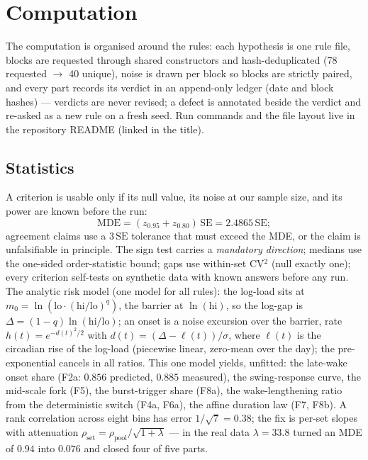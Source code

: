\documentclass[11pt,a4paper]{article}
\theoremstyle{remark}
\begin{document}
\section{Computation}\label{sec:code}
The computation is organised around the rules: each hypothesis is one rule file, blocks
are requested through shared constructors and hash-deduplicated (78 requested $\to$ 40
unique), noise is drawn per block so blocks are strictly paired, and every part records
its verdict in an append-only ledger (date and block hashes) --- verdicts are never
revised; a defect is annotated beside the verdict and re-asked as a new rule on a fresh
seed. Run commands and the file layout live in the repository README (linked in the
title).

\subsection{Statistics}\label{sec:stats}
A criterion is usable only if its null value, its noise at our sample size, and its
power are known before the run:
\begin{equation}\label{eq:mde}
\mathrm{MDE}=(z_{0.95}+z_{0.80})\,\mathrm{SE}=2.4865\,\mathrm{SE};
\end{equation}
agreement claims use a $3\,\mathrm{SE}$ tolerance that must exceed the MDE, or the
claim is unfalsifiable in principle. The sign test carries a \emph{mandatory direction};
medians use the one-sided
order-statistic bound; gaps use within-set CV$^2$ (null exactly one); every criterion
self-tests on synthetic data with known answers before any run. The analytic risk model
(one model for all rules): the log-load sits at $m_0=\ln(\mathrm{lo}\cdot
(\mathrm{hi}/\mathrm{lo})^q)$, the barrier at $\ln(\mathrm{hi})$, so the log-gap is
$\Delta=(1-q)\ln(\mathrm{hi}/\mathrm{lo})$; an onset is a noise excursion over the
barrier, rate $h(t)=e^{-d(t)^2/2}$ with $d(t)=(\Delta-\ell(t))/\sigma$, where
$\ell(t)$ is the circadian rise of the log-load (piecewise linear, zero-mean over the
day); the pre-exponential cancels in all ratios. This one model
yields, unfitted: the late-wake onset share (F2a: $0.856$ predicted, $0.885$ measured), the swing-response curve,
the mid-scale fork (F5), the burst-trigger share (F8a), the wake-lengthening ratio from
the deterministic switch (F4a, F6a), the affine duration law (F7, F8b). A rank
correlation across eight bins has error $1/\sqrt{7}=0.38$; the fix is per-set slopes with
attenuation $\rho_{\mathrm{set}}=\rho_{\mathrm{pool}}/\sqrt{1+\lambda}$ --- in the real
data $\lambda=33.8$ turned an MDE of $0.94$ into $0.076$ and closed four of five parts.
\end{document}
